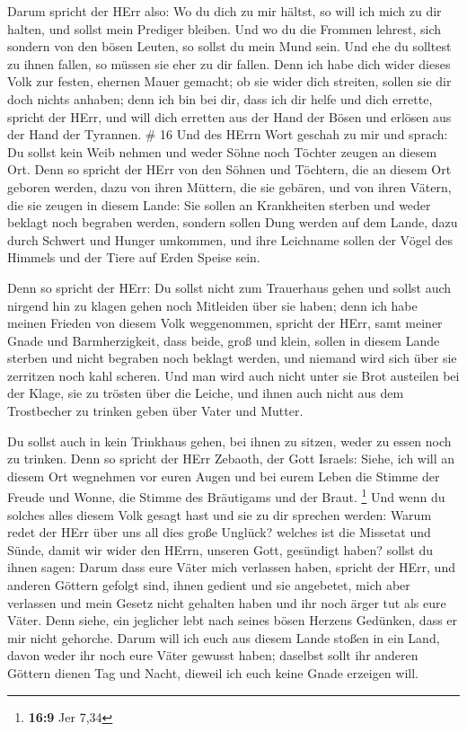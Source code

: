  Darum spricht der HErr also: Wo du dich zu mir hältst, so
will ich mich zu dir halten, und sollst mein Prediger bleiben. Und wo du
die Frommen lehrest, sich sondern von den bösen Leuten, so sollst du
mein Mund sein. Und ehe du solltest zu ihnen fallen, so müssen sie eher
zu dir fallen.  Denn ich habe dich wider dieses Volk zur
festen, ehernen Mauer gemacht; ob sie wider dich streiten, sollen sie
dir doch nichts anhaben; denn ich bin bei dir, dass ich dir helfe und
dich errette, spricht der HErr,  und will dich erretten aus
der Hand der Bösen und erlösen aus der Hand der Tyrannen. \# 16
 Und des HErrn Wort geschah zu mir und sprach: 
Du sollst kein Weib nehmen und weder Söhne noch Töchter zeugen an diesem
Ort.  Denn so spricht der HErr von den Söhnen und Töchtern,
die an diesem Ort geboren werden, dazu von ihren Müttern, die sie
gebären, und von ihren Vätern, die sie zeugen in diesem Lande:
 Sie sollen an Krankheiten sterben und weder beklagt noch
begraben werden, sondern sollen Dung werden auf dem Lande, dazu durch
Schwert und Hunger umkommen, und ihre Leichname sollen der Vögel des
Himmels und der Tiere auf Erden Speise sein.

 Denn so spricht der HErr: Du sollst nicht zum Trauerhaus
gehen und sollst auch nirgend hin zu klagen gehen noch Mitleiden über
sie haben; denn ich habe meinen Frieden von diesem Volk weggenommen,
spricht der HErr, samt meiner Gnade und Barmherzigkeit, 
dass beide, groß und klein, sollen in diesem Lande sterben und nicht
begraben noch beklagt werden, und niemand wird sich über sie zerritzen
noch kahl scheren.  Und man wird auch nicht unter sie Brot
austeilen bei der Klage, sie zu trösten über die Leiche, und ihnen auch
nicht aus dem Trostbecher zu trinken geben über Vater und Mutter.

 Du sollst auch in kein Trinkhaus gehen, bei ihnen zu
sitzen, weder zu essen noch zu trinken.  Denn so spricht der
HErr Zebaoth, der Gott Israels: Siehe, ich will an diesem Ort wegnehmen
vor euren Augen und bei eurem Leben die Stimme der Freude und Wonne, die
Stimme des Bräutigams und der Braut. \footnote{\textbf{16:9} Jer 7,34}
 Und wenn du solches alles diesem Volk gesagt hast und sie
zu dir sprechen werden: Warum redet der HErr über uns all dies große
Unglück? welches ist die Missetat und Sünde, damit wir wider den HErrn,
unseren Gott, gesündigt haben?  sollst du ihnen sagen:
Darum dass eure Väter mich verlassen haben, spricht der HErr, und
anderen Göttern gefolgt sind, ihnen gedient und sie angebetet, mich aber
verlassen und mein Gesetz nicht gehalten haben  und ihr
noch ärger tut als eure Väter. Denn siehe, ein jeglicher lebt nach
seines bösen Herzens Gedünken, dass er mir nicht gehorche. 
Darum will ich euch aus diesem Lande stoßen in ein Land, davon weder ihr
noch eure Väter gewusst haben; daselbst sollt ihr anderen Göttern dienen
Tag und Nacht, dieweil ich euch keine Gnade erzeigen will.

